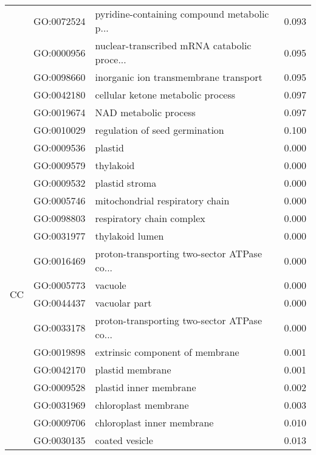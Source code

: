 \begin{longtable}{lllr}
   & GO:0072524 &  pyridine-containing compound metabolic p... &         0.093 \\
   & GO:0000956 &  nuclear-transcribed mRNA catabolic proce... &         0.095 \\
   & GO:0098660 &        inorganic ion transmembrane transport &         0.095 \\
   & GO:0042180 &            cellular ketone metabolic process &         0.097 \\
   & GO:0019674 &                        NAD metabolic process &         0.097 \\
   & GO:0010029 &               regulation of seed germination &         0.100 \\
\cline{1-4}
\multirow{23}{*}{CC} & GO:0009536 &                                      plastid &         0.000 \\
   & GO:0009579 &                                    thylakoid &         0.000 \\
   & GO:0009532 &                               plastid stroma &         0.000 \\
   & GO:0005746 &              mitochondrial respiratory chain &         0.000 \\
   & GO:0098803 &                    respiratory chain complex &         0.000 \\
   & GO:0031977 &                              thylakoid lumen &         0.000 \\
   & GO:0016469 &  proton-transporting two-sector ATPase co... &         0.000 \\
   & GO:0005773 &                                      vacuole &         0.000 \\
   & GO:0044437 &                                vacuolar part &         0.000 \\
   & GO:0033178 &  proton-transporting two-sector ATPase co... &         0.000 \\
   & GO:0019898 &              extrinsic component of membrane &         0.001 \\
   & GO:0042170 &                             plastid membrane &         0.001 \\
   & GO:0009528 &                       plastid inner membrane &         0.002 \\
   & GO:0031969 &                         chloroplast membrane &         0.003 \\
   & GO:0009706 &                   chloroplast inner membrane &         0.010 \\
   & GO:0030135 &                               coated vesicle &         0.013 \\

\end{longtable}
